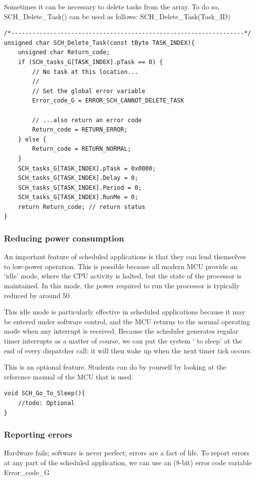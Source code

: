 \documentclass[twoside, final]{hcmut_report}
\begin{document}
Sometimes it can be necessary to delete tasks from the array. To do so,
SCH\_Delete\_Task() can be used as follows:
SCH\_Delete\_Task(Task\_ID)

\begin{lstlisting}[basicstyle=\small, caption=An implementation of the scheduler ‘delete task’ function]
/*------------------------------------------------------------------*/
unsigned char SCH_Delete_Task(const tByte TASK_INDEX){
    unsigned char Return_code;
    if (SCH_tasks_G[TASK_INDEX].pTask == 0) {
        // No task at this location...
        //
        // Set the global error variable
        Error_code_G = ERROR_SCH_CANNOT_DELETE_TASK
        
        // ...also return an error code
        Return_code = RETURN_ERROR;
    } else {
        Return_code = RETURN_NORMAL;
    } 
    SCH_tasks_G[TASK_INDEX].pTask = 0x0000;
    SCH_tasks_G[TASK_INDEX].Delay = 0;
    SCH_tasks_G[TASK_INDEX].Period = 0;
    SCH_tasks_G[TASK_INDEX].RunMe = 0;
    return Return_code; // return status
}
\end{lstlisting}
\subsubsection{Reducing power consumption}
An important feature of scheduled applications is that they can lend themselves to
low-power operation. This is possible because all modern MCU provide an ‘idle’ mode, where the CPU activity is halted, but the state of the processor is maintained. In this mode, the power required to run the processor is typically reduced by around 50%

This idle mode is particularly effective in scheduled applications because it may be
entered under software control, and the MCU returns to the normal operating mode when any interrupt is received. Because the scheduler generates regular timer interrupts as a matter of course, we can put the system ‘ to sleep’ at the end of every dispatcher call: it will then wake up when the next timer tick occurs.

This is an optional feature. Students can do by yourself by looking at the reference manual of the MCU that is used. 
\begin{lstlisting}[basicstyle=\small, caption=An implementation of the scheduler ‘go to sleep’ function]
void SCH_Go_To_Sleep(){
    //todo: Optional
}
\end{lstlisting}

\subsubsection{Reporting errors}
Hardware fails; software is never perfect; errors are a fact of life. 
To report errors at any part of the scheduled application, we can use an (8-bit) error
code variable Error\_code\_G
\end{document}
